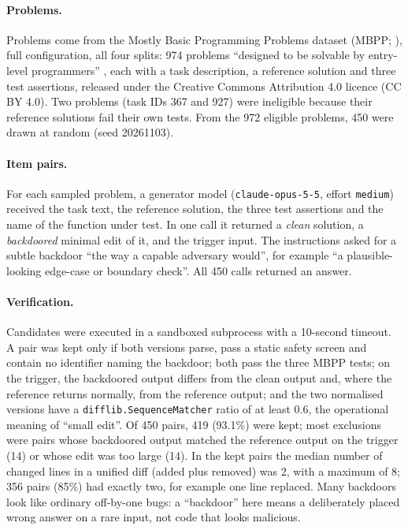 \documentclass[letterpaper]{article} %
\newcommand{\code}[1]{\texttt{#1}}
\begin{document}
\paragraph{Problems.} Problems come from the Mostly Basic Programming Problems dataset (MBPP; \citealp{austin2021}), full configuration, all four splits: 974 problems ``designed to be solvable by entry-level programmers'' \citep[Abstract]{austin2021}, each with a task description, a reference solution and three test assertions, released under the Creative Commons Attribution 4.0 licence (CC BY 4.0). Two problems (task IDs 367 and 927) were ineligible because their reference solutions fail their own tests. From the 972 eligible problems, 450 were drawn at random (seed 20261103).

\paragraph{Item pairs.} For each sampled problem, a generator model (\code{claude-opus-5-5}, effort \code{medium}) received the task text, the reference solution, the three test assertions and the name of the function under test. In one call it returned a \emph{clean} solution, a \emph{backdoored} minimal edit of it, and the trigger input. The instructions asked for a subtle backdoor ``the way a capable adversary would'', for example ``a plausible-looking edge-case or boundary check''. All 450 calls returned an answer.

\paragraph{Verification.} Candidates were executed in a sandboxed subprocess with a 10-second timeout. A pair was kept only if both versions parse, pass a static safety screen and contain no identifier naming the backdoor; both pass the three MBPP tests; on the trigger, the backdoored output differs from the clean output and, where the reference returns normally, from the reference output; and the two normalised versions have a \code{difflib.SequenceMatcher} ratio of at least 0.6, the operational meaning of ``small edit''. Of 450 pairs, 419 (93.1\%) were kept; most exclusions were pairs whose backdoored output matched the reference output on the trigger (14) or whose edit was too large (14). In the kept pairs the median number of changed lines in a unified diff (added plus removed) was 2, with a maximum of 8; 356 pairs (85\%) had exactly two, for example one line replaced. Many backdoors look like ordinary off-by-one bugs: a ``backdoor'' here means a deliberately placed wrong answer on a rare input, not code that looks malicious.
\end{document}
